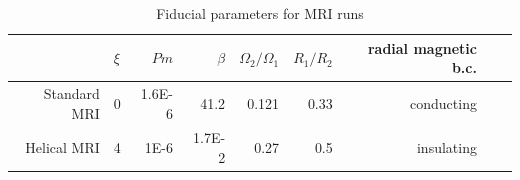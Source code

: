 \documentclass{emulateapj}
\begin{document}



\begin{table}[ht]
\normalsize
\caption{Fiducial parameters for MRI runs} \label{table:parameters}
\centering
\begin{tabular}{rlrrrrrrr}
  \hline
 & $\xi$ & $Pm$ & $\beta$ & $\Omega_2/\Omega_1$ & $R_1/R_2$ & radial magnetic b.c. \\ 
  \hline\hline
Standard MRI & 0 & 1.6E-6 & 41.2 & 0.121 & 0.33 & conducting \\ 
Helical MRI & 4 & 1E-6 & 1.7E-2 & 0.27 & 0.5 & insulating\\ 
   \hline
\end{tabular}
\end{table} 
\end{document}
